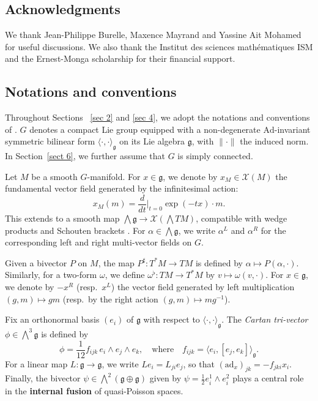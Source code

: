 \documentclass[reqno]{amsart}
\theoremstyle{plain}
\theoremstyle{definition}
\begin{document}
\subsection*{Acknowledgments} We thank Jean-Philippe Burelle, Maxence Mayrand and Yassine Ait Mohamed for useful discussions. We also thank the Institut des sciences mathématiques ISM and the Ernest-Monga scholarship for their financial support.



\subsection{Notations and conventions}

Throughout Sections ~\ref{sec 2} and \ref{sec 4}, we adopt the notations and conventions of \cite{alekseev2002quasi}. $G$ denotes a compact Lie group equipped with a non-degenerate $\mathrm{Ad}$-invariant symmetric bilinear form $\langle \cdot, \cdot\rangle_{\mathfrak{g}}$ on its Lie algebra $\mathfrak{g}$, with $\|\cdot\|$ the induced norm. In Section~\ref{sect 6}, we further assume that $G$ is simply connected.

Let $M$ be a smooth $G$-manifold. For $x \in \mathfrak{g}$, we denote by $x_{M} \in \mathcal{X}(M)$ the fundamental vector field generated by the infinitesimal action:
\[
x_{M}(m) = \frac{d}{dt}\Big|_{t=0}\exp(-tx)\cdot m.
\]
This extends to a smooth map $\bigwedge \mathfrak{g} \to \mathcal{X}(\bigwedge TM)$, compatible with wedge products and Schouten brackets \cite[Section~1]{alekseev2002quasi}. For $\alpha \in \bigwedge \mathfrak{g}$, we write $\alpha^L$ and $\alpha^R$ for the corresponding left and right multi-vector fields on $G$.

Given a bivector $P$ on $M$, the map $P^{\sharp}: T^{*}M \to TM$ is defined by $\alpha \mapsto P(\alpha,\cdot)$. Similarly, for a two-form $\omega$, we define $\omega^{\flat}: TM \to T^{*}M$ by $v \mapsto \omega(v,\cdot)$. For $x \in \mathfrak{g}$, we denote by $-x^{R}$ (resp.\ $x^{L}$) the vector field generated by left multiplication $(g,m) \mapsto gm$ (resp.\ by the right action $(g,m) \mapsto mg^{-1}$).

Fix an orthonormal basis $(e_{i})$ of $\mathfrak{g}$ with respect to $\langle\cdot,\cdot\rangle_{\mathfrak{g}}$. The \emph{Cartan tri-vector} $\phi \in \bigwedge^3 \mathfrak{g}$ is defined by
\[
\phi = \frac{1}{12} f_{ijk}\, e_{i}\wedge e_{j}\wedge e_{k}, \quad \text{where} \quad f_{ijk} = \langle e_{i}, [e_{j},e_{k}] \rangle_{\mathfrak{g}}.
\]
For a linear map $L: \mathfrak{g} \to \mathfrak{g}$, we write $Le_{i} = L_{ji}e_{j}$, so that $(\mathrm{ad}_{x})_{jk} = -f_{jki}x_{i}$. Finally, the bivector $\psi \in \bigwedge^{2}(\mathfrak{g} \oplus \mathfrak{g})$ given by $\psi = \frac{1}{2}e_{i}^{1}\wedge e_{i}^{2}$ plays a central role in the \textbf{internal fusion} of quasi-Poisson spaces.
\end{document}
